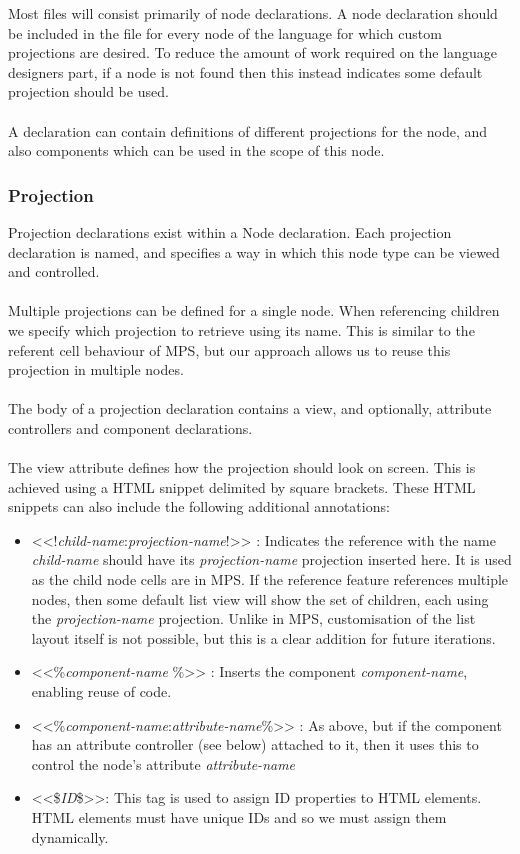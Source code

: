 \documentclass{article}
\begin{document}
{Most files will consist primarily of node declarations. A node declaration should be included in the file for every node of the language for which custom projections are desired. To reduce the amount of work required on the language designers part, if a node is not found then this instead indicates some default projection should be used.  
\\
\\
A declaration can contain definitions of different projections for the node, and also components which can be used in the scope of this node.

\subsubsection{Projection}
Projection declarations exist within a Node declaration. Each projection declaration is named, and specifies a way in which this node type can be viewed and controlled.
\\
\\
Multiple projections can be defined for a single node. When referencing children we specify which projection to retrieve using its name. This is similar to the referent cell behaviour of MPS, but our approach allows us to reuse this projection in multiple nodes.
\\
\\
The body of a projection declaration contains a view, and optionally, attribute controllers and component declarations.
\\
\\
The view attribute defines how the projection should look on screen. This is achieved using a HTML snippet delimited by square brackets. These HTML snippets can also include the following additional annotations:
\begin{itemize}
\item <<!\emph{child-name}:\emph{projection-name}!>> : Indicates the reference with the name \emph{child-name} should have its \emph{projection-name} projection inserted here. It is used as the child node cells are in MPS. If the reference feature references multiple nodes, then some default list view will show the set of children, each using the \emph{projection-name} projection. Unlike in MPS, customisation of the list layout itself is not possible, but this is a clear addition for future iterations.
\item <<\%\emph{component-name} \%>> : Inserts the component \emph{component-name}, enabling reuse of code.
\item <<\%\emph{component-name}:\emph{attribute-name}\%>> : As above, but if the component has an attribute controller (see below) attached to it, then it uses this to control the node's attribute \emph{attribute-name}
\item <<\$\emph{ID}\$>>: This tag is used to assign ID properties to HTML elements. HTML elements must have unique IDs and so we must assign them dynamically.
\end{itemize}

}
\end{document}
